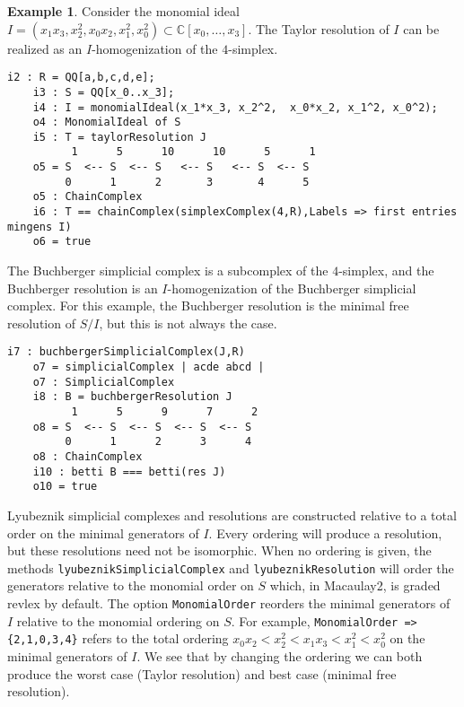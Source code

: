 \documentclass[12pt,leqno]{amsart}
\theoremstyle{definition}
\newtheorem{example}[lemma]{Example}
\begin{document}
\begin{example}
  Consider the monomial ideal $I = (x_1x_3, x_2^2, x_0x_2, x_1^2, x_0^2) \subset \mathbb C[x_0,\dotsc,x_3]$. The Taylor resolution of $I$ can be realized as an $I$-homogenization of the $4$-simplex. 
%  
\begin{lstlisting}[basicstyle={\ttfamily \scriptsize}, xleftmargin=-23pt]
    i2 : R = QQ[a,b,c,d,e];
    i3 : S = QQ[x_0..x_3];
    i4 : I = monomialIdeal(x_1*x_3, x_2^2,  x_0*x_2, x_1^2, x_0^2);
    o4 : MonomialIdeal of S
    i5 : T = taylorResolution J
          1      5      10      10      5      1
    o5 = S  <-- S  <-- S   <-- S   <-- S  <-- S
         0      1      2       3       4      5
    o5 : ChainComplex
    i6 : T == chainComplex(simplexComplex(4,R),Labels => first entries mingens I)
    o6 = true
\end{lstlisting}
  The Buchberger simplicial complex is a subcomplex of the $4$-simplex, and the Buchberger resolution is an $I$-homogenization of the Buchberger simplicial complex. For this example, the Buchberger resolution is the minimal free resolution of $S/I$, but this is not always the case.
\begin{lstlisting}[basicstyle={\ttfamily \scriptsize}, xleftmargin=-23pt]
    i7 : buchbergerSimplicialComplex(J,R)
    o7 = simplicialComplex | acde abcd |
    o7 : SimplicialComplex
    i8 : B = buchbergerResolution J
          1      5      9      7      2
    o8 = S  <-- S  <-- S  <-- S  <-- S
         0      1      2      3      4
    o8 : ChainComplex
    i10 : betti B === betti(res J)
    o10 = true
\end{lstlisting}
Lyubeznik simplicial complexes and resolutions are constructed relative to a total order on the minimal generators of $I$. Every ordering will produce a resolution, but these resolutions need not be isomorphic. When no ordering is given, the methods \texttt{lyubeznikSimplicialComplex} and \texttt{lyubeznikResolution} will order the generators relative to the monomial order on $S$ which, in Macaulay2, is graded revlex by default. The option \texttt{MonomialOrder} reorders the minimal generators of $I$ relative to the monomial ordering on $S$. For example, \texttt{MonomialOrder => \{2,1,0,3,4\}} refers to the total ordering $x_0x_2 <  x_2^2 < x_1x_3 < x_1^2 < x_0^2$ on the minimal generators of $I$. We see that by changing the ordering we can both produce the worst case (Taylor resolution) and best case (minimal free resolution).
\begin{lstlisting}[basicstyle={\ttfamily \scriptsize}, xleftmargin=-23pt]

\end{lstlisting}
\end{example}
\end{document}
